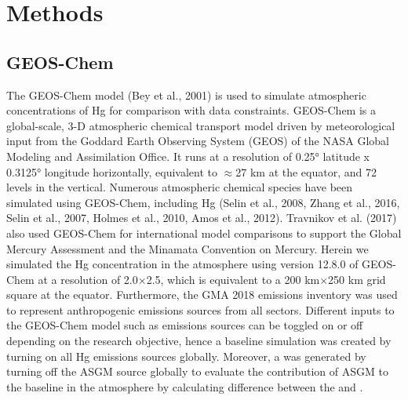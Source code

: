 \section{Methods}
\subsection{GEOS-Chem}
\begin{flushleft}
The GEOS-Chem model (Bey et al., 2001) is used to simulate atmospheric concentrations of Hg for comparison with data constraints. GEOS-Chem is a global-scale, 3-D atmospheric chemical transport model driven by meteorological input from the Goddard Earth Observing System (GEOS) of the NASA Global Modeling and Assimilation Office. It runs at a resolution of 0.25° latitude x 0.3125° longitude horizontally, equivalent to $\approx$27 km at the equator, and 72 levels in the vertical. Numerous atmospheric chemical species have been simulated using GEOS-Chem, including Hg (Selin et al., 2008, Zhang et al., 2016, Selin et al., 2007, Holmes et al., 2010, Amos et al., 2012). Travnikov et al. (2017) also used GEOS-Chem for international model comparisons to support the Global Mercury Assessment and the Minamata Convention on Mercury.
Herein we simulated the Hg concentration in the atmosphere using version 12.8.0 of GEOS-Chem at a resolution of 2.0$\times$2.5, which is equivalent to a 200 km$\times$250 km grid square at the equator. Furthermore, the GMA 2018 emissions inventory was used to represent anthropogenic emissions sources from all sectors. Different inputs to the GEOS-Chem model such as emissions sources can be toggled on or off depending on the research objective, hence a baseline simulation was created by turning on all Hg emissions sources globally. Moreover, a \off was generated by turning off the ASGM source globally to evaluate the contribution of ASGM to the baseline \hg in the atmosphere by calculating difference between the \on and \off.
\end{flushleft}

\begin{table}[H]
\label{tab:geos_chem_simulation_description}

\centering
{}

\end{table}

